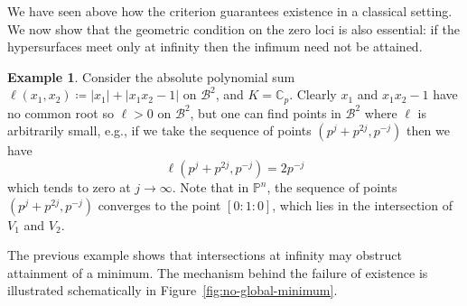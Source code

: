 \documentclass[10pt]{article}
\theoremstyle{definition}
\newtheorem{example}[theorem]{Example}
\newcommand{\CC}{\mathbb{C}}
\newcommand{\PP}{\mathbb{P}}
\begin{document}
We have seen above how the criterion guarantees existence in a classical setting. We now show that the geometric condition on the zero loci is also essential: if the hypersurfaces meet only at infinity then the infimum need not be attained.

\begin{example}
  Consider the absolute polynomial sum $\ell(x_1,x_2)\coloneqq |x_1| + |x_1 x_2 - 1|$ on $\mathcal{B}^2$, and $K = \CC_p$. Clearly $x_1$ and $x_1x_2-1$ have no common root so $\ell > 0$ on $\mathcal{B}^2$, but one can find points in $\mathcal{B}^2$ where $\ell$ is arbitrarily small, e.g., if we take the sequence of points $(p^{j} + p^{2j}, p^{-j})$ then we have
  $$
  \ell(p^{j} + p^{2j}, p^{-j}) = 2p^{-j}
  $$
  which tends to zero at $j \to \infty$. Note that in $\PP^n$, the sequence of points $(p^{j} + p^{2j}, p^{-j})$ converges to the point $[0:1:0]$, which lies in the intersection of $V_1$ and $V_2$.
\end{example}

The previous example shows that intersections at infinity may obstruct attainment of a minimum. The mechanism behind the failure of existence is illustrated schematically in Figure~\ref{fig:no-global-minimum}.
\end{document}
